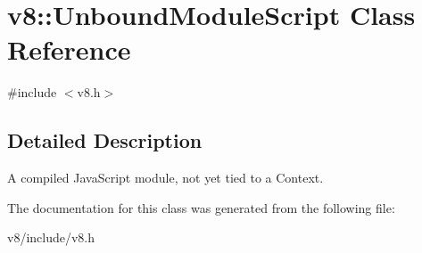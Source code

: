 \hypertarget{classv8_1_1UnboundModuleScript}{}\section{v8\+:\+:Unbound\+Module\+Script Class Reference}
\label{classv8_1_1UnboundModuleScript}


{\ttfamily \#include $<$v8.\+h$>$}



\subsection{Detailed Description}
A compiled Java\+Script module, not yet tied to a Context. 

The documentation for this class was generated from the following file\+:\begin{DoxyCompactItemize}
\item 
v8/include/v8.\+h\end{DoxyCompactItemize}
